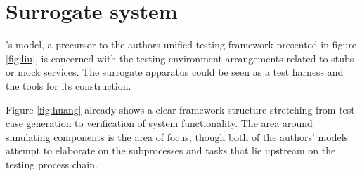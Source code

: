\documentclass[12pt,a4paper,oneside,pdftex]{report}
\begin{document}
\section{Surrogate system}

\citeauthor{huang2008surrogate}'s \citeyearpar{huang2008surrogate} model, a precursor to the authors unified testing framework presented in figure \ref{fig:liu}, is concerned with the testing environment arrangements related to stubs or mock services. The surrogate apparatus could be seen as a test harness and the tools for its construction. 

Figure \ref{fig:huang} already shows a clear framework structure stretching from test case generation to verification of system functionality. The area around simulating components is the area of focus, though both of the authors' models attempt to elaborate on the subprocesses and tasks that lie upstream on the testing process chain. \citep{huang2008surrogate}

\begin{comment}
\begin{figure}[H]
\centering
\pgfdeclarelayer{marx}
\pgfsetlayers{main,marx}
\begin{tikzpicture}[
    start chain=going below,    %
    node distance=3mm and 30mm, %
    ]
\tikzset{
  base/.style={draw, on chain, on grid, align=center, minimum height=4ex},
  proc/.style={base, rectangle, minimum height=4em, text width=4em},
  cont/.style={base, rectangle, rounded corners, minimum height=4em, minimum width=6em, text width=6em},
  elli/.style={base, ellipse, minimum height=4.5em, text width=4.5em},
  line/.style={draw, thick, -latex'}
}
\node [proc] (desc) {Service description};
\node [proc] (tcs) {Configured test cases};
\node [proc, right=of desc] (gen) {Generator};
\node [proc] (ten) {Test engine};
\node [cont, right=of gen] (app) {Application container};
\node [proc] (sgt) {Surrogate};
\node [proc] (sen) {Surrogate engine};
\node [proc, right=of sgt] (rea) {Real component};
\path [line] (desc) -- (gen);
\path [line] (gen) -- (sgt);
\path [line] (tcs) -- (ten);
\path [line] (ten) -- (sen);
\path [line] (sgt) -- (sen);
\path [line] (sen) -- (sgt);
\end{tikzpicture}
\caption{Surrogate system architecture \citep{huang2008surrogate}} \label{fig:surrogate}
\end{figure}
\end{comment}
\end{document}
